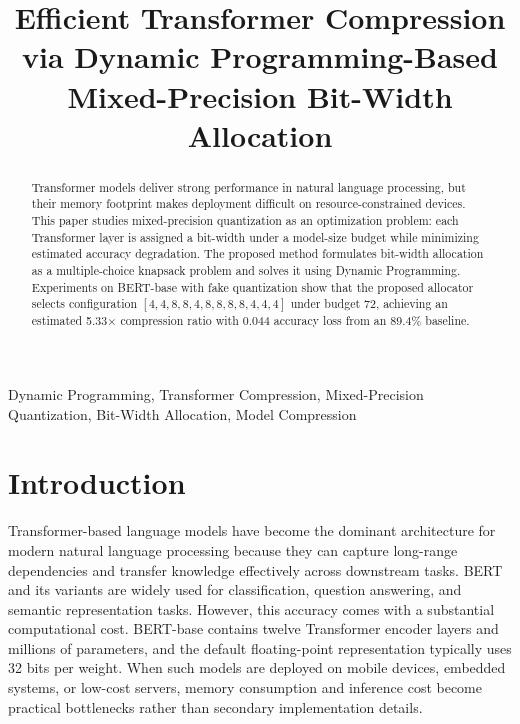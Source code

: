 \documentclass[conference]{IEEEtran}
\begin{document}
\title{Efficient Transformer Compression via Dynamic Programming-Based Mixed-Precision Bit-Width Allocation}

\author{
}

\maketitle
\thispagestyle{paperfooter}

\begin{abstract}
Transformer models deliver strong performance in natural language processing, but their memory footprint makes deployment difficult on resource-constrained devices. This paper studies mixed-precision quantization as an optimization problem: each Transformer layer is assigned a bit-width under a model-size budget while minimizing estimated accuracy degradation. The proposed method formulates bit-width allocation as a multiple-choice knapsack problem and solves it using Dynamic Programming. Experiments on BERT-base with fake quantization show that the proposed allocator selects configuration $[4,4,8,8,4,8,8,8,8,4,4,4]$ under budget 72, achieving an estimated 5.33$\times$ compression ratio with 0.044 accuracy loss from an 89.4\% baseline.
\end{abstract}

\begin{IEEEkeywords}
Dynamic Programming, Transformer Compression, Mixed-Precision Quantization, Bit-Width Allocation, Model Compression
\end{IEEEkeywords}

\section{Introduction}
Transformer-based language models have become the dominant architecture for modern natural language processing because they can capture long-range dependencies and transfer knowledge effectively across downstream tasks. BERT and its variants are widely used for classification, question answering, and semantic representation tasks. However, this accuracy comes with a substantial computational cost. BERT-base contains twelve Transformer encoder layers and millions of parameters, and the default floating-point representation typically uses 32 bits per weight. When such models are deployed on mobile devices, embedded systems, or low-cost servers, memory consumption and inference cost become practical bottlenecks rather than secondary implementation details.
\end{document}
